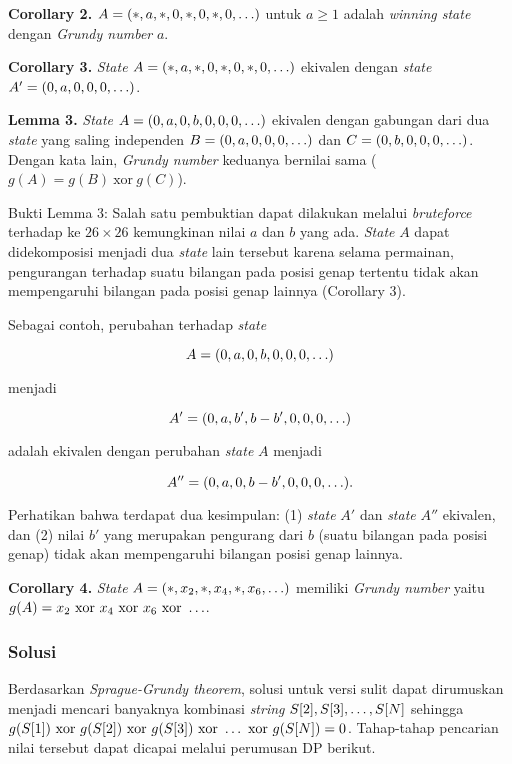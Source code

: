 \documentclass[../main_editorial.tex]{subfiles} %
\begin{document}
\textbf{Corollary 2.} $ A = (*, a, *, 0, *, 0, *, 0, \mathellipsis) $ untuk $ a \ge 1 $ adalah \textit{winning state} dengan \textit{Grundy number} $ a $.

\textbf{Corollary 3.} \textit{State} $ A = (*, a, *, 0, *, 0, *, 0, \mathellipsis) $ ekivalen dengan \textit{state} $ A' = (0, a, 0, 0, 0, \mathellipsis) $.

\textbf{Lemma 3.} \textit{State} $ A = (0, a, 0, b, 0, 0, 0, \mathellipsis) $ ekivalen dengan gabungan dari dua \textit{state} yang saling independen $ B = (0, a, 0, 0, 0, \mathellipsis) $ dan $ C = (0, b, 0, 0, 0, \mathellipsis) $. Dengan kata lain, \textit{Grundy number} keduanya bernilai sama ($ g(A) = g(B)\ \mathrm{xor}\ g(C) $).

Bukti Lemma 3: Salah satu pembuktian dapat dilakukan melalui \textit{bruteforce} terhadap ke $ 26\times 26 $ kemungkinan nilai $ a $ dan $ b $ yang ada. \textit{State} $ A $ dapat didekomposisi menjadi dua \textit{state} lain tersebut karena selama permainan, pengurangan terhadap suatu bilangan pada posisi genap tertentu tidak akan mempengaruhi bilangan pada posisi genap lainnya (Corollary 3).

Sebagai contoh, perubahan terhadap \textit{state}

$$
	A = (0, a, 0, b, 0, 0, 0, \mathellipsis)
$$

menjadi 

$$
	A' = (0, a, b', b - b', 0, 0, 0, \mathellipsis)
$$

adalah ekivalen dengan perubahan \textit{state} $ A $ menjadi

$$
	A'' = (0, a, 0, b - b', 0, 0, 0, \mathellipsis).
$$

Perhatikan bahwa terdapat dua kesimpulan: (1) \textit{state} $ A' $ dan \textit{state} $ A'' $ ekivalen, dan (2) nilai $ b' $ yang merupakan pengurang dari $ b $ (suatu bilangan pada posisi genap) tidak akan mempengaruhi bilangan posisi genap lainnya.

\textbf{Corollary 4.} \textit{State} $ A = (*, x_2, *, x_4, *, x_6, \mathellipsis) $ memiliki \textit{Grundy number} yaitu $g(A) = x_2\ \mathrm{xor}\ x_4\ \mathrm{xor}\ x_6\ \mathrm{xor}\ \mathellipsis $.

\subsubsection*{Solusi}

Berdasarkan \textit{Sprague-Grundy theorem}, solusi untuk versi sulit dapat dirumuskan menjadi mencari banyaknya kombinasi \textit{string} $ S[2], S[3], \mathellipsis, S[N] $ sehingga $ g(S[1])\ \mathrm{xor}\ g(S[2])\ \mathrm{xor}\ g(S[3])\ \mathrm{xor}\ \mathellipsis\ \mathrm{xor}\ g(S[N]) = 0$. Tahap-tahap pencarian nilai tersebut dapat dicapai melalui perumusan DP berikut.
\end{document}
